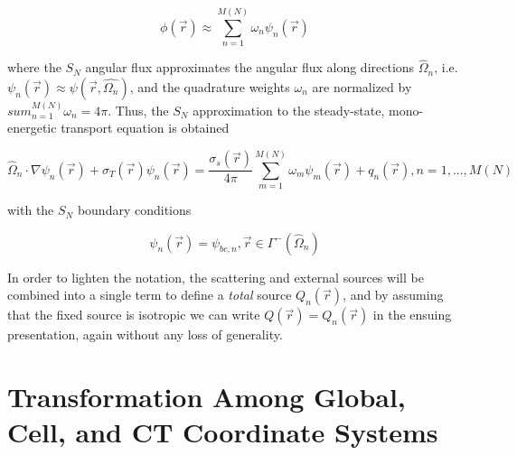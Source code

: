 \begin{equation}
    \phi (\Vec{r} ) \approx \sum_{n=1}^{M(N)} \omega_n \psi_n ( \Vec{r} )
\end{equation}

\noindent where the $S_N$ angular flux approximates the angular flux along directions $\hat{\Omega}_n$, i.e. $\psi_n ( \Vec{r} ) \approx \psi ( \Vec{r} , \hat{\Omega_n} ) $, and the quadrature weights $\omega_n$ are normalized by $sum_{n=1}^{M(N)} \omega_n = 4 \pi$.
Thus, the $S_N$ approximation to the steady-state, mono-energetic transport equation is obtained

\begin{equation}
    \hat{\Omega}_n  \cdot \nabla \psi_n ( \Vec{r} ) + \sigma_T (\Vec{r}) \psi_n ( \Vec{r} ) = \frac{\sigma_s ( \Vec{r} )}{4 \pi} \sum_{m=1}^{M(N)} \omega_m \psi_m ( \Vec{r} ) + q_n (\Vec{r}), n=1,...,M(N)
\end{equation}

\noindent with the $S_N$ boundary conditions

\begin{equation}
    \psi_n ( \Vec{r} ) = \psi_{bc,n}, \Vec{r} \in \Gamma^- ( \hat{\Omega}_n )
\end{equation}

In order to lighten the notation, the scattering and external sources will be combined into a single term to define a \textit{total} source $Q_n ( \vec{r})$, and by assuming that the fixed source is isotropic we can write $Q ( \vec{r} ) = Q_n ( \vec{r})$ in the ensuing presentation, again without any loss of generality.

\section{Transformation Among Global, Cell, and CT Coordinate Systems}

